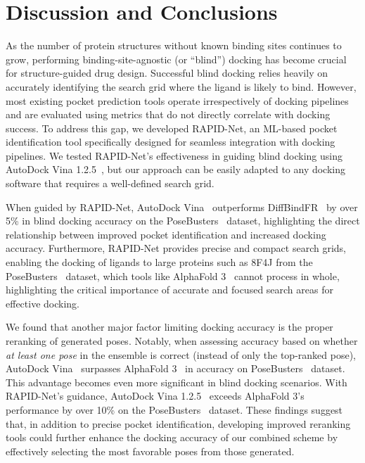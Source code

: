 \documentclass[10pt,conference]{IEEEtran}
\begin{document}
\section{Discussion and Conclusions}
\label{Discussion}

As the number of protein structures without known binding sites continues to grow, performing binding-site-agnostic (or ``blind'') docking has become crucial for structure-guided drug design. Successful blind docking relies heavily on accurately identifying the search grid where the ligand is likely to bind. However, most existing pocket prediction tools operate irrespectively of docking pipelines and are evaluated using metrics that do not directly correlate with docking success. To address this gap, we developed RAPID-Net, an ML-based pocket identification tool specifically designed for seamless integration with docking pipelines. We tested RAPID-Net's effectiveness in guiding blind docking using AutoDock Vina 1.2.5~\cite{eberhardt2021autodock}, but our approach can be easily adapted to any docking software that requires a well-defined search grid. 


When guided by RAPID-Net, AutoDock Vina~\cite{eberhardt2021autodock} outperforms DiffBindFR~\cite{zhu2024diffbindfr} by over 5\% in blind docking accuracy on the PoseBusters~\cite{Buttenschoen2024} dataset, highlighting the direct relationship between improved pocket identification and increased docking accuracy. Furthermore, RAPID-Net provides precise and compact search grids, enabling the docking of ligands to large proteins such as 8F4J from the PoseBusters~\cite{Buttenschoen2024} dataset, which tools like AlphaFold 3~\cite{abramson2024accurate} cannot process in whole, highlighting the critical importance of accurate and focused search areas for effective docking.

We found that another major factor limiting docking accuracy is the proper reranking of generated poses. Notably, when assessing accuracy based on whether \textit{at least one pose} in the ensemble is correct (instead of only the top-ranked pose), AutoDock Vina~\cite{eberhardt2021autodock} surpasses AlphaFold 3~\cite{abramson2024accurate} in accuracy on PoseBusters~\cite{Buttenschoen2024} dataset. This advantage becomes even more significant in blind docking scenarios. With RAPID-Net’s guidance, AutoDock Vina 1.2.5~\cite{eberhardt2021autodock} exceeds AlphaFold 3’s performance by over 10\% on the PoseBusters~\cite{Buttenschoen2024} dataset. These findings suggest that, in addition to precise pocket identification, developing improved reranking tools could further enhance the docking accuracy of our combined scheme by effectively selecting the most favorable poses from those generated.
\end{document}
